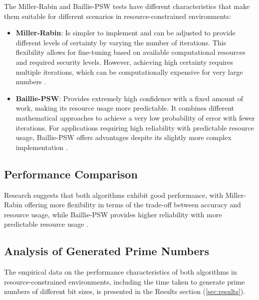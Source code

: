The Miller-Rabin and Baillie-PSW tests have different characteristics that make them suitable for different scenarios in resource-constrained environments:

\begin{itemize}
    \item \textbf{Miller-Rabin}: Is simpler to implement and can be adjusted to provide different levels of certainty by varying the number of iterations. This flexibility allows for fine-tuning based on available computational resources and required security levels. However, achieving high certainty requires multiple iterations, which can be computationally expensive for very large numbers \cite{taxonomy_primality}.
    
    \item \textbf{Baillie-PSW}: Provides extremely high confidence with a fixed amount of work, making its resource usage more predictable. It combines different mathematical approaches to achieve a very low probability of error with fewer iterations. For applications requiring high reliability with predictable resource usage, Baillie-PSW offers advantages despite its slightly more complex implementation \cite{hardware_baillie}.
\end{itemize}

\subsection{Performance Comparison}

Research suggests that both algorithms exhibit good performance, with Miller-Rabin offering more flexibility in terms of the trade-off between accuracy and resource usage, while Baillie-PSW provides higher reliability with more predictable resource usage \cite{taxonomy_primality}.

\subsection{Analysis of Generated Prime Numbers}

The empirical data on the performance characteristics of both algorithms in resource-constrained environments, including the time taken to generate prime numbers of different bit sizes, is presented in the Results section (\autoref{sec:results}). 